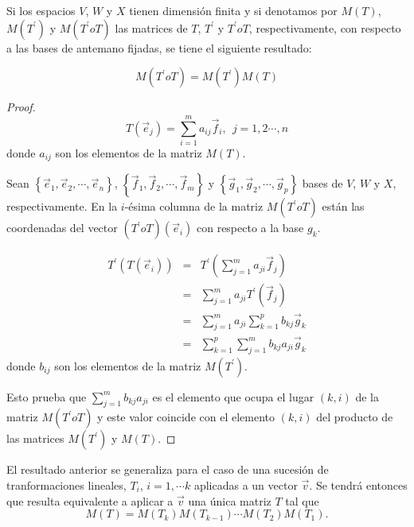 \bigskip


\begin{theorem}
 Si los espacios $V$, $W$ y $X$ tienen dimensión finita y si denotamos por $M(T)$, $M(T ^\prime)$ y $M(T ^\prime o T)$ las matrices de $T$, $T ^\prime$ y $T ^\prime o T $, respectivamente, con respecto a las bases de antemano fijadas, se tiene el siguiente resultado:

$$M(T ^\prime o T)= M(T ^\prime)M(T)$$


\begin{proof}
\begin{equation}
\label{Tej}
T(\vec{e}_j)=\sum_{i=1}^{m}a_{ij}\vec{f}_i,~~ j=1,2 \cdots,n
\end{equation}
donde $a_{ij}$ son los elementos de la matriz $M(T)$.

\bigskip

Sean $\left\{\vec{e}_1,\vec{e}_2,\cdots, \vec{e}_n\right\}$, $\left\{\vec{f}_1,\vec{f}_2,\cdots, \vec{f}_m\right\}$  y $\left\{\vec{g}_1,\vec{g}_2,\cdots, \vec{g}_p\right\}$  bases  de $V$, $W$ y $X$, respectivamente. 
En la $i$-ésima columna de la matriz   $M(T ^\prime o T)$    están las coordenadas del vector $(T ^\prime o T)(\vec{e}_i)$ con respecto a la base $g_k$.

\begin{eqnarray*}
T ^\prime (T(\vec{e}_i))&= &T ^\prime ( \sum_{j=1}^{m}a_{ji}\vec{f}_j)\\
&= &\sum_{j=1}^{m}a_{ji} T ^\prime ( \vec{f}_j)\\
&= &\sum_{j=1}^{m}a_{ji} \sum_{k=1}^{p}b_{kj}  \vec{g}_k\\
&= &\sum_{k=1}^{p}\sum_{j=1}^{m}b_{kj} a_{ji} \vec{g}_k
\end{eqnarray*}
\bigskip
\noindent
donde $b_{ij}$ son los elementos de la matriz $M(T ^\prime)$.

Esto prueba que $  \sum_{j=1}^{m}b_{kj} a_{ji}$ es el elemento que ocupa el lugar $(k,i)$ de la matriz $ M(T ^\prime o T)$ y este valor coincide con el elemento $(k,i)$ del producto de las matrices $M(T ^\prime)$ y $M(T)$.

\end{proof}
\end{theorem} 

\bigskip

\begin{remark}
El resultado anterior se generaliza para el caso de una sucesión de tranformaciones lineales, $T_i$, $i=1, \cdots k$ aplicadas a un vector $\Vec{v}$. Se tendrá entonces que resulta equivalente a aplicar a $\Vec{v}$ una única matriz $T$ tal que   $$M(T)= M(T_k)M(T_{k-1}) \cdots M(T_{2}) M(T_{1})  .$$
\end{remark}

